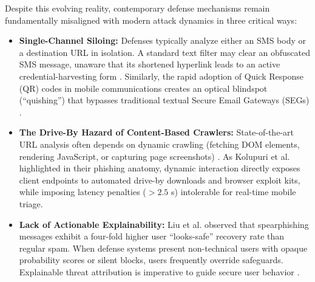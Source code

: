 \documentclass[conference]{IEEEtran}
\begin{document}
Despite this evolving reality, contemporary defense mechanisms remain fundamentally misaligned with modern attack dynamics in three critical ways:
\begin{itemize}
    \item \textbf{Single-Channel Siloing:} Defenses typically analyze either an SMS body or a destination URL in isolation. A standard text filter may clear an obfuscated SMS message, unaware that its shortened hyperlink leads to an active credential-harvesting form \cite{gupta2023smishing}. Similarly, the rapid adoption of Quick Response (QR) codes in mobile communications creates an optical blindspot (``quishing'') that bypasses traditional textual Secure Email Gateways (SEGs) \cite{sangar2026quishing}.
    \item \textbf{The Drive-By Hazard of Content-Based Crawlers:} State-of-the-art URL analysis often depends on dynamic crawling (fetching DOM elements, rendering JavaScript, or capturing page screenshots) \cite{sahoo2019malicious}. As Kolupuri et al. \cite{kolupuri2025scams} highlighted in their phishing anatomy, dynamic interaction directly exposes client endpoints to automated drive-by downloads and browser exploit kits, while imposing latency penalties ($>2.5$ s) intolerable for real-time mobile triage.
    \item \textbf{Lack of Actionable Explainability:} Liu et al. \cite{liu2021detecting} observed that spearphishing messages exhibit a four-fold higher user ``looks-safe'' recovery rate than regular spam. When defense systems present non-technical users with opaque probability scores or silent blocks, users frequently override safeguards. Explainable threat attribution is imperative to guide secure user behavior \cite{bhatt2020explainable}.
\end{itemize}
\end{document}
